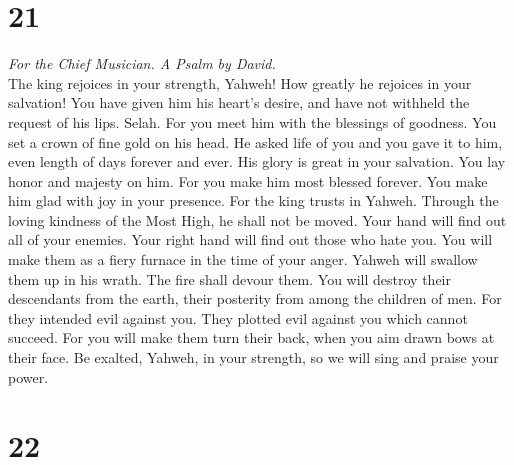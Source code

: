 \hypertarget{section-20}{%
\section{21}\label{section-20}}

\emph{For the Chief Musician. A Psalm by David.}\\
 The king rejoices in your strength, Yahweh! How greatly
he rejoices in your salvation!  You have given him his
heart's desire, and have not withheld the request of his lips. Selah.
 For you meet him with the blessings of goodness. You set
a crown of fine gold on his head.  He asked life of you
and you gave it to him, even length of days forever and ever.
 His glory is great in your salvation. You lay honor and
majesty on him.  For you make him most blessed forever.
You make him glad with joy in your presence.  For the king
trusts in Yahweh. Through the loving kindness of the Most High, he shall
not be moved.  Your hand will find out all of your
enemies. Your right hand will find out those who hate you.
 You will make them as a fiery furnace in the time of your
anger. Yahweh will swallow them up in his wrath. The fire shall devour
them.  You will destroy their descendants from the earth,
their posterity from among the children of men.  For they
intended evil against you. They plotted evil against you which cannot
succeed.  For you will make them turn their back, when
you aim drawn bows at their face.  Be exalted, Yahweh, in
your strength, so we will sing and praise your power.

\hypertarget{section-21}{%
\section{22}\label{section-21}}


